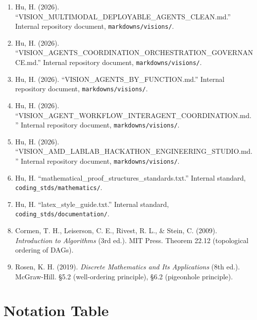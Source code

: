 \documentclass[12pt]{article}
\theoremstyle{definition}
\begin{document}
\begin{sloppypar}
\begin{enumerate}
    \item Hu, H. (2026). ``VISION\_MULTIMODAL\_\allowbreak DEPLOYABLE\_AGENTS\_CLEAN.md.''
          Internal repository document, \texttt{markdowns/visions/}.
    \item Hu, H. (2026). ``VISION\_AGENTS\_COORDINATION\_\allowbreak ORCHESTRATION\_\allowbreak GOVERNANCE.md.'' Internal repository document,
          \texttt{markdowns/visions/}.
    \item Hu, H. (2026). ``VISION\_AGENTS\_BY\_FUNCTION.md.'' Internal
          repository document, \texttt{markdowns/visions/}.
    \item Hu, H. (2026). ``VISION\_AGENT\_WORKFLOW\_INTERAGENT\_\allowbreak COORDINATION.md.'' Internal repository document,
          \texttt{markdowns/visions/}.
    \item Hu, H. (2026). ``VISION\_AMD\_LABLAB\_HACKATHON\_ENGINEERING\_\allowbreak STUDIO.md.'' Internal repository document,
          \texttt{markdowns/visions/}.
    \item Hu, H. ``mathematical\_proof\_\allowbreak structures\_standards.txt.''
          Internal standard, \texttt{coding\_stds/mathematics/}.
    \item Hu, H. ``latex\_style\_guide.txt.'' Internal standard,
          \texttt{coding\_stds/documentation/}.
    \item Cormen, T. H., Leiserson, C. E., Rivest, R. L., \& Stein, C.
          (2009). \textit{Introduction to Algorithms} (3rd ed.). MIT
          Press. Theorem 22.12 (topological ordering of DAGs).
    \item Rosen, K. H. (2019). \textit{Discrete Mathematics and Its
          Applications} (8th ed.). McGraw-Hill. \S5.2 (well-ordering
          principle), \S6.2 (pigeonhole principle).
\end{enumerate}
\end{sloppypar}

\newpage
\appendix
\section{Notation Table}
\label{app:notation}
\end{document}
